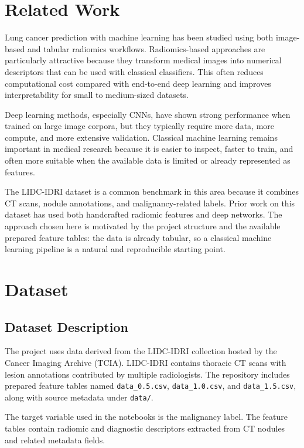 \documentclass[11pt,a4paper]{article}
\begin{document}
\section{Related Work}


Lung cancer prediction with machine learning has been studied using both image-based and tabular radiomics workflows. Radiomics-based approaches are particularly attractive because they transform medical images into numerical descriptors that can be used with classical classifiers. This often reduces computational cost compared with end-to-end deep learning and improves interpretability for small to medium-sized datasets.

Deep learning methods, especially CNNs, have shown strong performance when trained on large image corpora, but they typically require more data, more compute, and more extensive validation. Classical machine learning remains important in medical research because it is easier to inspect, faster to train, and often more suitable when the available data is limited or already represented as features.

The LIDC-IDRI dataset is a common benchmark in this area because it combines CT scans, nodule annotations, and malignancy-related labels. Prior work on this dataset has used both handcrafted radiomic features and deep networks. The approach chosen here is motivated by the project structure and the available prepared feature tables: the data is already tabular, so a classical machine learning pipeline is a natural and reproducible starting point.

\section{Dataset}
\subsection{Dataset Description}


The project uses data derived from the LIDC-IDRI collection hosted by the Cancer Imaging Archive (TCIA). LIDC-IDRI contains thoracic CT scans with lesion annotations contributed by multiple radiologists. The repository includes prepared feature tables named \texttt{data\_0.5.csv}, \texttt{data\_1.0.csv}, and \texttt{data\_1.5.csv}, along with source metadata under \texttt{data/}.

The target variable used in the notebooks is the malignancy label. The feature tables contain radiomic and diagnostic descriptors extracted from CT nodules and related metadata fields.
\end{document}
